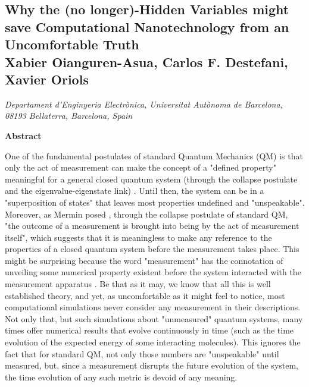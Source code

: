 \documentclass[11pt, a4paper]{article} %
\begin{document}
\begin{center}
\section*{ Why the (no longer)-Hidden Variables might save Computational Nanotechnology from an Uncomfortable Truth \vspace{0.2cm}\vspace{0.1cm}\\ \small Xabier Oianguren-Asua, Carlos F. Destefani, Xavier Oriols\vspace{-0.4cm}}
{\footnotesize \em Departament d’Enginyeria Electrònica, Universitat Autònoma de Barcelona, 08193 Bellaterra, Barcelona, Spain}
\vspace{-0.5cm}
\end{center}
\begin{center}
{ \bf \hspace{5mm} {Abstract}\vspace{-1.2cm}}
\end{center}
\hspace{5mm} 

One of the fundamental postulates of standard Quantum Mechanics (QM) is that only the act of measurement can make the concept of a "defined property" meaningful for a general closed quantum system (through the collapse postulate and the eigenvalue-eigenstate link) \cite{vonNeumann,where, consp}. Until then, the system can be in a "superposition of states" that leaves most properties undefined and "unspeakable". Moreover, as Mermin posed \cite{mermin}, through the collapse postulate of standard QM, "the outcome of a measurement is brought into being by the act of measurement itself", which suggests that it is meaningless to make any reference to the properties of a closed quantum system before the measurement takes place. This might be surprising because the word "measurement" has the connotation of unveiling some numerical property existent before the system interacted with the measurement apparatus \cite{Bell}. Be that as it may, we know that all this is well established theory, and yet, as uncomfortable as it might feel to notice, most computational simulations never consider any measurement in their descriptions. Not only that, but such simulations about "unmeasured" quantum systems, many times offer numerical results that evolve continuously in time (such as the time evolution of the expected energy of some interacting molecules). This ignores the fact that for standard QM, not only those numbers are "unspeakable" until measured, but, since a measurement disrupts the future evolution of the system, the time evolution of any such metric is devoid of any meaning.
\end{document}
